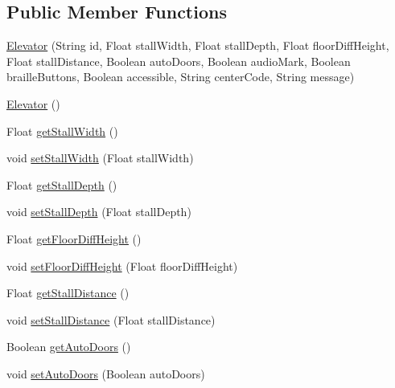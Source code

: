 \subsection*{Public Member Functions}
\begin{DoxyCompactItemize}
\item 
\mbox{\hyperlink{classcom_1_1osoc_1_1oncera_1_1javabean_1_1_elevator_a067115a965ffdb6c6217eee594554f09}{Elevator}} (String id, Float stall\+Width, Float stall\+Depth, Float floor\+Diff\+Height, Float stall\+Distance, Boolean auto\+Doors, Boolean audio\+Mark, Boolean braille\+Buttons, Boolean accessible, String center\+Code, String message)
\item 
\mbox{\hyperlink{classcom_1_1osoc_1_1oncera_1_1javabean_1_1_elevator_a32bf2808a2d2ce284441ee25d48b0cb3}{Elevator}} ()
\item 
Float \mbox{\hyperlink{classcom_1_1osoc_1_1oncera_1_1javabean_1_1_elevator_abda7e519915994037ab90680f75f128e}{get\+Stall\+Width}} ()
\item 
void \mbox{\hyperlink{classcom_1_1osoc_1_1oncera_1_1javabean_1_1_elevator_a96f23c44f5b81490920162015ec57b0a}{set\+Stall\+Width}} (Float stall\+Width)
\item 
Float \mbox{\hyperlink{classcom_1_1osoc_1_1oncera_1_1javabean_1_1_elevator_a81476732c9ce87e00552edc54c8bab9e}{get\+Stall\+Depth}} ()
\item 
void \mbox{\hyperlink{classcom_1_1osoc_1_1oncera_1_1javabean_1_1_elevator_a55f193a7be9f487ac13d3ba0cc5cd875}{set\+Stall\+Depth}} (Float stall\+Depth)
\item 
Float \mbox{\hyperlink{classcom_1_1osoc_1_1oncera_1_1javabean_1_1_elevator_aeced937750672a48d3e1db3d5212b772}{get\+Floor\+Diff\+Height}} ()
\item 
void \mbox{\hyperlink{classcom_1_1osoc_1_1oncera_1_1javabean_1_1_elevator_a7deadf1d568e443729b0fec27df56260}{set\+Floor\+Diff\+Height}} (Float floor\+Diff\+Height)
\item 
Float \mbox{\hyperlink{classcom_1_1osoc_1_1oncera_1_1javabean_1_1_elevator_aad269ae41d690238780aa949542957d7}{get\+Stall\+Distance}} ()
\item 
void \mbox{\hyperlink{classcom_1_1osoc_1_1oncera_1_1javabean_1_1_elevator_a8730a1c661282cdc2bac889cd53f068c}{set\+Stall\+Distance}} (Float stall\+Distance)
\item 
Boolean \mbox{\hyperlink{classcom_1_1osoc_1_1oncera_1_1javabean_1_1_elevator_a1b57b69e0962fc0d2fcf375bc8715d22}{get\+Auto\+Doors}} ()
\item 
void \mbox{\hyperlink{classcom_1_1osoc_1_1oncera_1_1javabean_1_1_elevator_a31d66e1e260ca1ce777a5e5ba97bf8d5}{set\+Auto\+Doors}} (Boolean auto\+Doors)

\end{DoxyCompactItemize}
